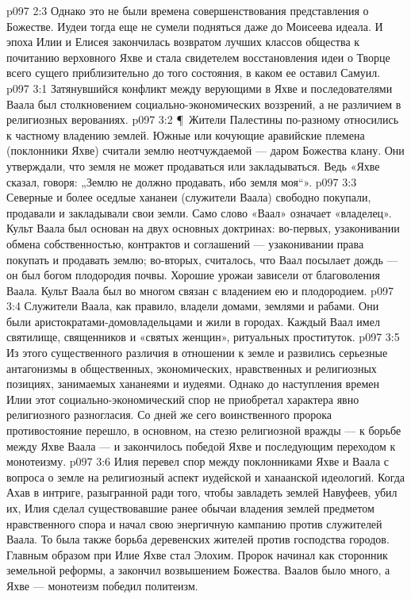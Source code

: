 \vs p097 2:3 Однако это не были времена совершенствования представления о Божестве. Иудеи тогда еще не сумели подняться даже до Моисеева идеала. И эпоха Илии и Елисея закончилась возвратом лучших классов общества к почитанию верховного Яхве и стала свидетелем восстановления идеи о Творце всего сущего приблизительно до того состояния, в каком ее оставил Самуил.
\vs p097 3:1 Затянувшийся конфликт между верующими в Яхве и последователями Ваала был столкновением социально\hyp{}экономических воззрений, а не различием в религиозных верованиях.
\vs p097 3:2 \P\ Жители Палестины по\hyp{}разному относились к частному владению землей. Южные или кочующие аравийские племена (поклонники Яхве) считали землю неотчуждаемой --- даром Божества клану. Они утверждали, что земля не может продаваться или закладываться. Ведь «Яхве сказал, говоря: „Землю не должно продавать, ибо земля моя“».
\vs p097 3:3 Северные и более оседлые хананеи (служители Ваала) свободно покупали, продавали и закладывали свои земли. Само слово «Ваал» означает «владелец». Культ Ваала был основан на двух основных доктринах: во\hyp{}первых, узаконивании обмена собственностью, контрактов и соглашений --- узаконивании права покупать и продавать землю; во\hyp{}вторых, считалось, что Ваал посылает дождь --- он был богом плодородия почвы. Хорошие урожаи зависели от благоволения Ваала. Культ Ваала был во многом связан с  владением ею и плодородием.
\vs p097 3:4 Служители Ваала, как правило, владели домами, землями и рабами. Они были аристократами\hyp{}домовладельцами и жили в городах. Каждый Ваал имел святилище, священников и «святых женщин», ритуальных проституток.
\vs p097 3:5 Из этого существенного различия в отношении к земле и развились серьезные антагонизмы в общественных, экономических, нравственных и религиозных позициях, занимаемых хананеями и иудеями. Однако до наступления времен Илии этот социально\hyp{}экономический спор не приобретал характера явно религиозного разногласия. Со дней же сего воинственного пророка противостояние перешло, в основном, на стезю религиозной вражды --- к борьбе между Яхве  Ваала --- и закончилось победой Яхве и последующим переходом к монотеизму.
\vs p097 3:6 Илия перевел спор между поклонниками Яхве и Ваала с вопроса о земле на религиозный аспект иудейской и ханаанской идеологий. Когда Ахав в интриге, разыгранной ради того, чтобы завладеть землей Навуфеев, убил их, Илия сделал существовавшие ранее обычаи владения землей предметом нравственного спора и начал свою энергичную кампанию против служителей Ваала. То была также борьба деревенских жителей против господства городов. Главным образом при Илие Яхве стал Элохим. Пророк начинал как сторонник земельной реформы, а закончил возвышением Божества. Ваалов было много, а Яхве ---  монотеизм победил политеизм.
